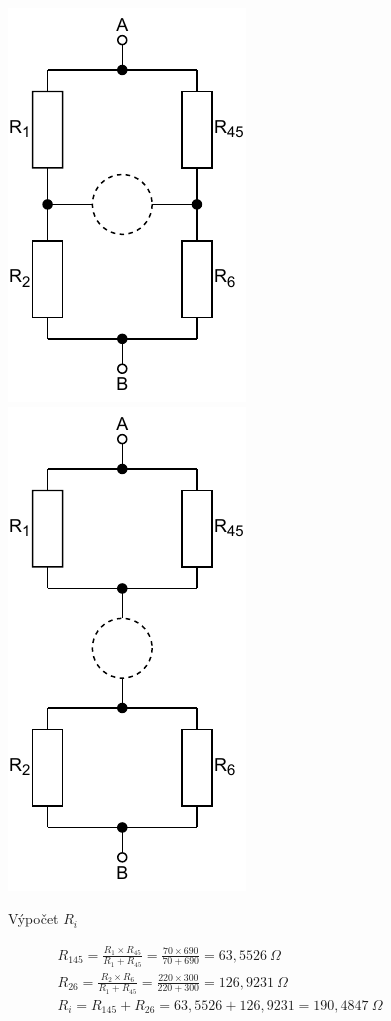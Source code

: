\begin{figure}[h]
    \centering
    \includegraphics[scale=0.8,keepaspectratio]{fig/Pr2_krok2_1.pdf}
    \includegraphics[scale=0.8,keepaspectratio]{fig/Pr2_krok2_2.pdf}
    \caption{Výpočet $R_i$}
    \label{pic:Pr2_krok2}
\end{figure}

\begin{center}
    \begin{gather*}
        R_{145} = \frac{R_1 \times R_45}{R_1 + R_{45}} = \frac{70 \times 690}{70 + 690} = 63,5526 \: \Omega \\[6pt]
        R_{26} = \frac{R_2 \times R_6}{R_1 + R_{45}} = \frac{220 \times 300}{220 + 300} = 126,9231 \: \Omega \\[6pt]
        R_i = R_{145} + R_{26} = 63,5526 + 126,9231 = 190,4847 \: \Omega \\
    \end{gather*}
\end{center}

